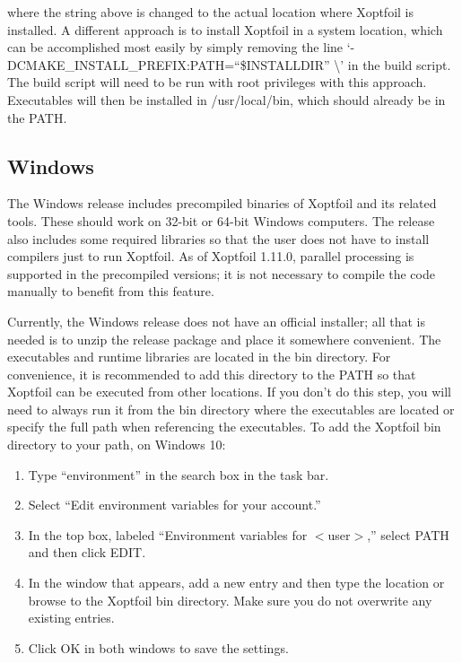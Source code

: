 \documentclass[11pt]{article}
\begin{document}
\noindent where the string above is changed to the actual location where Xoptfoil is
installed. A different approach is to install Xoptfoil in a system location, which can be
accomplished most easily by simply removing the line
`-DCMAKE\_INSTALL\_PREFIX:PATH=``\$INSTALLDIR'' \textbackslash' in the build script. The
build script will need to be run with root privileges with this approach. Executables will
then be installed in /usr/local/bin, which should already be in the PATH.

\subsection{Windows}\label{sec:install_windows}

The Windows release includes precompiled binaries of Xoptfoil and its related tools. These
should work on 32-bit or 64-bit Windows computers. The release also includes some required
libraries so that the user does not have to install compilers just to run Xoptfoil. As of
Xoptfoil 1.11.0, parallel processing is supported in the precompiled versions; it is not
necessary to compile the code manually to benefit from this feature.

Currently, the Windows release does not have an official installer; all that is needed is
to unzip the release package and place it somewhere convenient. The executables and
runtime libraries are located in the bin directory. For convenience, it is recommended to
add this directory to the PATH so that Xoptfoil can be executed from other locations. If
you don't do this step, you will need to always run it from the bin directory where the
executables are located or specify the full path when referencing the executables.
To add the Xoptfoil bin directory to your path, on Windows 10:

\begin{enumerate}
  \item{Type ``environment'' in the search box in the task bar.}
  \item{Select ``Edit environment variables for your account.''}
  \item{In the top box, labeled ``Environment variables for $<$user$>$,'' select PATH and
then click EDIT.}
  \item{In the window that appears, add a new entry and then type the location or browse to
the Xoptfoil bin directory. Make sure you do not overwrite any existing entries.}
  \item{Click OK in both windows to save the settings.}
\end{enumerate}
\end{document}
